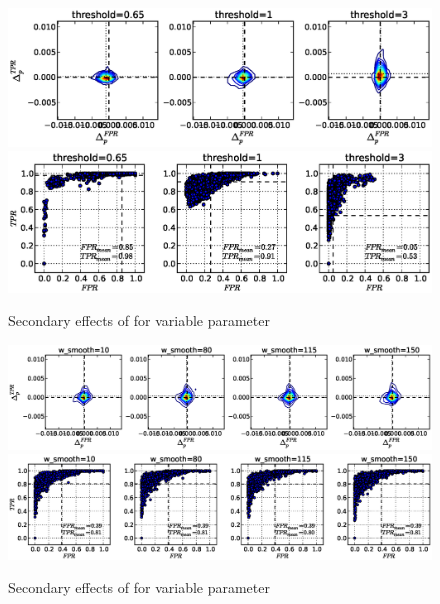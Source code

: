 \begin{figure}[!h]
\begin{center}
\includegraphics[width=6in]{../fig/final/delta_hist_sec/cmpr_window/threshold}
\includegraphics[width=5.5in]{../fig/final/position/all_allowed/cmpr_window/threshold}
\end{center}
\caption{\label{fig:delta_sec6} Secondary effects of  for
  variable parameter }
\end{figure}

\begin{figure}[!h]
\begin{center}
\includegraphics[width=6in]{../fig/final/delta_hist_sec/cmpr_window/w_smooth}
\includegraphics[width=5.5in]{../fig/final/position/all_allowed/cmpr_window/w_smooth}
\end{center}
\caption{\label{fig:delta_sec6} Secondary effects of  for
  variable parameter }
\end{figure}

